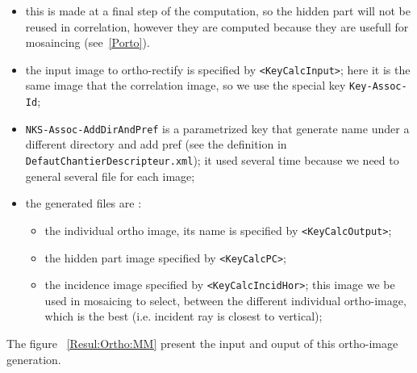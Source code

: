 \begin{itemize}
    \item  this is made at a final step of the computation, so the hidden part will not be reused in correlation,
           however they are computed because they are usefull for mosaincing (see~\ref{Porto}).

    \item the input image to ortho-rectify is specified by {\tt <KeyCalcInput>}; here it is the same
          image that the correlation image, so we use the special key {\tt Key-Assoc-Id};

    \item {\tt NKS-Assoc-AddDirAndPref} is a parametrized key that generate name under a different directory
          and add pref (see the definition in {\tt DefautChantierDescripteur.xml}); it used several time
          because we need to general several file for each image;
 

    \item the generated files  are :

    \begin{itemize}
            \item the individual ortho image, its name is specified by {\tt <KeyCalcOutput>};
            \item the hidden part image specified by {\tt <KeyCalcPC>};
            \item the incidence image  specified by {\tt <KeyCalcIncidHor>}; this image we be used
                  in mosaicing to select, between the different individual ortho-image, which is
                  the best (i.e. incident ray is closest to vertical);
    \end{itemize}

\end{itemize}

The figure ~\ref{Resul:Ortho:MM} present the input and ouput of this ortho-image generation.

